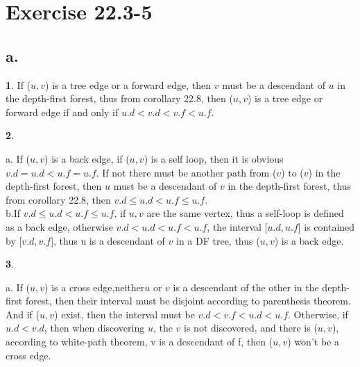 \documentclass[oneside]{homework} %
\begin{document}
\maketitle
\newpage
\section{Exercise 22.3-5}
\subsection*{a.}
\textbf{1}. If ($\mathit{u},\mathit{v}$) is a tree edge or a forward edge, then $\mathit{v}$ must be a descendant of $\mathit{u}$ in the depth-first forest, thus from corollary 22.8, then 
($\mathit{u},\mathit{v}$) is a tree edge or forward edge if and only if $\mathit{u}.d < \mathit{v}.d <\mathit{v}.f < \mathit{u}.f$.

\noindent \textbf{2}. 

a. If ($\mathit{u},\mathit{v}$) is a back edge, if ($\mathit{u},\mathit{v}$) is a self loop, then it is obvious $\mathit{v}.d = \mathit{u}.d <\mathit{u}.f = \mathit{u}.f$. If not there must be another path from ($\mathit{v}$) to ($\mathit{v}$) in the depth-first forest, then  $\mathit{u}$ must be a descendant of $\mathit{v}$ in the depth-first forest, thus from corollary 22.8, then $\mathit{v}.d \leq \mathit{u}.d <\mathit{u}.f \leq \mathit{u}.f$.
\\

b.If $\mathit{v}.d \leq \mathit{u}.d <\mathit{u}.f \leq \mathit{u}.f$, if $u,v$ are the same vertex, thus a  self-loop is defined as a back edge, otherwise $\mathit{v}.d < \mathit{u}.d <\mathit{u}.f < \mathit{u}.f$, the interval [$\mathit{u}.d,\mathit{u}.f$] is contained by [$\mathit{v}.d,\mathit{v}.f$], thus u is a descendant of $\mathit{v}$ in a DF tree, thus ($\mathit{u},\mathit{v}$) is a back edge.


\noindent \textbf{3}. 

a. If ($\mathit{u},\mathit{v}$) is a cross edge,neither$\mathit{u}$ or $\mathit{v}$ is a descendant of the other in the depth-first forest, then their interval must be disjoint according to parenthesis theorem. And if ($\mathit{u},\mathit{v}$) exist, then the interval must be $\mathit{v}.d < \mathit{v}.f <\mathit{u}.d < \mathit{u}.f$. Otherwise, if $\mathit{u}.d < \mathit{v}.d$, then when discovering $\mathit{u}$, the $\mathit{v}$ is not discovered, and there is ($\mathit{u},\mathit{v}$), according to white-path theorem, v is a descendant of f, then ($\mathit{u},\mathit{v}$) won't be a cross edge.
\\
\end{document}
